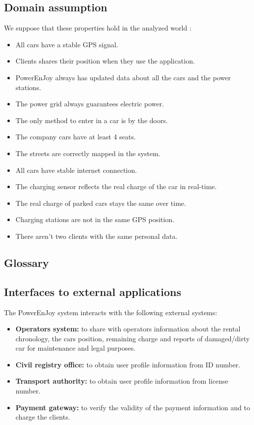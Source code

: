 \subsection{Domain assumption}
We suppose that these properties hold in the analyzed world :
\begin{itemize}
\item All cars have a stable GPS signal.
\item Clients shares their position when they use the application.
\item PowerEnJoy always has updated data about all the cars and the power stations.
\item The power grid always guarantees electric power.
\item The only method to enter in a car is by the doors.
\item The company cars have at least 4 seats.
\item The streets are correctly mapped in the system.
\item All cars have stable internet connection.
\item The charging sensor reflects the real charge of the car in real-time.
\item The real charge of parked cars stays the same over time. 
\item Charging stations are not in the same GPS position.
\item There aren't two clients with the same  personal data.
\end{itemize}

\newpage

\subsection{Glossary}


\subsection{Interfaces to external applications}
The PowerEnJoy system interacts with the following external systems:
\begin{itemize}
\item \textbf{Operators system:} to share with operators information about the rental chronology, the cars position, remaining charge and  reports of damaged/dirty car for maintenance and legal purposes. 
\item  \textbf{Civil registry office:} to obtain user profile information from ID number.
\item \textbf{Transport authority:}  to obtain user profile information from license number.
\item \textbf{Payment gateway:} to verify the validity of the payment information and to charge the clients. 
\end{itemize}


